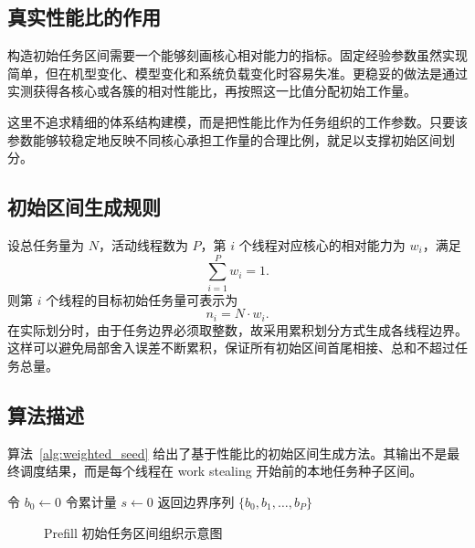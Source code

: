 \subsection{真实性能比的作用}

构造初始任务区间需要一个能够刻画核心相对能力的指标。固定经验参数虽然实现简单，但在机型变化、模型变化和系统负载变化时容易失准。更稳妥的做法是通过实测获得各核心或各簇的相对性能比，再按照这一比值分配初始工作量\cite{wang2021asymo,abdelgawad2022bertperf}。

这里不追求精细的体系结构建模，而是把性能比作为任务组织的工作参数。只要该参数能够较稳定地反映不同核心承担工作量的合理比例，就足以支撑初始区间划分。

\subsection{初始区间生成规则}

设总任务量为 $N$，活动线程数为 $P$，第 $i$ 个线程对应核心的相对能力为 $w_i$，满足
\[
\sum_{i=1}^{P} w_i = 1.
\]
则第 $i$ 个线程的目标初始任务量可表示为
\[
n_i = N \cdot w_i.
\]
在实际划分时，由于任务边界必须取整数，故采用累积划分方式生成各线程边界。这样可以避免局部舍入误差不断累积，保证所有初始区间首尾相接、总和不超过任务总量。

\subsection{算法描述}

算法~\ref{alg:weighted_seed} 给出了基于性能比的初始区间生成方法。其输出不是最终调度结果，而是每个线程在 work stealing 开始前的本地任务种子区间。

\begin{algorithm}[ht]
\caption{基于真实性能比的初始区间生成}
\label{alg:weighted_seed}
令 $b_0 \leftarrow 0$\;
令累计量 $s \leftarrow 0$\;
返回边界序列 $\{b_0,b_1,\ldots,b_P\}$\;
\end{algorithm}

\begin{figure}[ht]
  \centering
  \caption{Prefill 初始任务区间组织示意图}
  \label{fig:prefill_seed_placeholder}
\end{figure}

